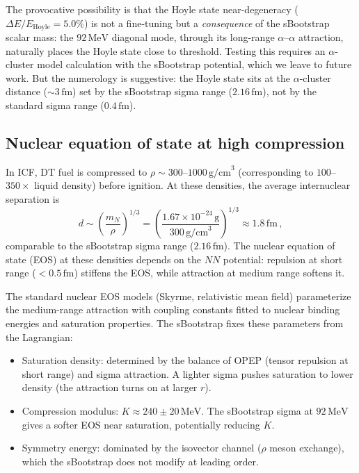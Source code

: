 \documentclass[12pt,a4paper]{article}
\newcommand{\MeV}{\,\text{MeV}}
\begin{document}
The provocative possibility is that the Hoyle state near-degeneracy
($\Delta E / E_{\text{Hoyle}} = 5.0\%$) is not a fine-tuning but
a \emph{consequence} of the sBootstrap scalar mass: the $92\MeV$
diagonal mode, through its long-range $\alpha$--$\alpha$ attraction,
naturally places the Hoyle state close to threshold.  Testing this
requires an $\alpha$-cluster model calculation with the sBootstrap
potential, which we leave to future work.  But the numerology is
suggestive: the Hoyle state sits at the $\alpha$-cluster distance
($\sim 3\,\text{fm}$) set by the sBootstrap sigma range
($2.16\,\text{fm}$), not by the standard sigma range
($0.4\,\text{fm}$).

\subsection{Nuclear equation of state at high compression}

In ICF, DT fuel is compressed to
$\rho \sim 300$--$1000\,\text{g/cm}^3$ (corresponding to
$100$--$350\times$ liquid density) before ignition.  At these
densities, the average internuclear separation is
\begin{equation}
  d \sim \left(\frac{m_N}{\rho}\right)^{1/3}
  = \left(\frac{1.67 \times 10^{-24}\,\text{g}}{300\,\text{g/cm}^3}\right)^{1/3}
  \approx 1.8\,\text{fm}\,,
\end{equation}
comparable to the sBootstrap sigma range ($2.16\,\text{fm}$).
The nuclear equation of state (EOS) at these densities depends on
the $NN$ potential: repulsion at short range ($< 0.5\,\text{fm}$)
stiffens the EOS, while attraction at medium range softens it.

The standard nuclear EOS models (Skyrme, relativistic mean field)
parameterize the medium-range attraction with coupling constants
fitted to nuclear binding energies and saturation properties.  The
sBootstrap fixes these parameters from the Lagrangian:
\begin{itemize}
\item Saturation density: determined by the balance of OPEP
  (tensor repulsion at short range) and sigma attraction.  A lighter
  sigma pushes saturation to lower density (the attraction turns on
  at larger $r$).
\item Compression modulus: $K \approx 240 \pm 20\MeV$.  The
  sBootstrap sigma at $92\MeV$ gives a softer EOS near
  saturation, potentially reducing $K$.
\item Symmetry energy: dominated by the isovector channel ($\rho$
  meson exchange), which the sBootstrap does not modify at leading
  order.
\end{itemize}
\end{document}

